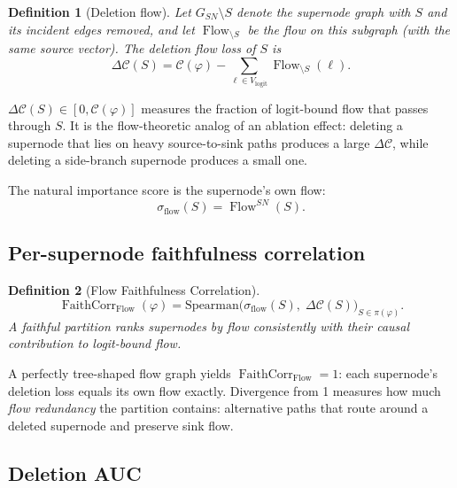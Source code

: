 \documentclass[11pt]{article}
\DeclareMathOperator{\Flow}{Flow}
\DeclareMathOperator{\FaithCorr}{FaithCorr}
\newtheorem{definition}{Definition}
\begin{document}
\begin{definition}[Deletion flow]\label{def:deletion-flow}
Let $G_{SN} \setminus S$ denote the supernode graph with $S$ and
its incident edges removed, and let $\Flow_{\setminus S}$ be the
flow on this subgraph (with the same source vector). The
\emph{deletion flow loss} of $S$ is
\begin{equation}
\Delta \mathcal{C}(S)
= \mathcal{C}(\varphi)
- \sum_{\ell \in V_{\text{logit}}} \Flow_{\setminus S}(\ell).
\label{eq:deletion-flow}
\end{equation}
\end{definition}

$\Delta \mathcal{C}(S) \in [0, \mathcal{C}(\varphi)]$ measures the
fraction of logit-bound flow that passes through $S$. It is the
flow-theoretic analog of an ablation effect: deleting a supernode
that lies on heavy source-to-sink paths produces a large
$\Delta \mathcal{C}$, while deleting a side-branch supernode
produces a small one.

The natural importance score is the supernode's own flow:
\begin{equation}
\sigma_{\text{flow}}(S) = \Flow^{SN}(S).
\label{eq:sigma-flow}
\end{equation}

\subsection{Per-supernode faithfulness correlation}

\begin{definition}[Flow Faithfulness Correlation]\label{def:flow-faithcorr}
\begin{equation}
\FaithCorr_{\Flow}(\varphi)
= \mathrm{Spearman}\bigl(
    \sigma_{\text{flow}}(S),\;
    \Delta \mathcal{C}(S)
  \bigr)_{S \in \pi(\varphi)}.
\label{eq:flow-faithcorr}
\end{equation}
A faithful partition ranks supernodes by flow consistently with
their causal contribution to logit-bound flow.
\end{definition}

A perfectly tree-shaped flow graph yields
$\FaithCorr_{\Flow} = 1$: each supernode's deletion loss equals its
own flow exactly. Divergence from 1 measures how much
\emph{flow redundancy} the partition contains: alternative paths
that route around a deleted supernode and preserve sink flow.

\subsection{Deletion AUC}
\end{document}
